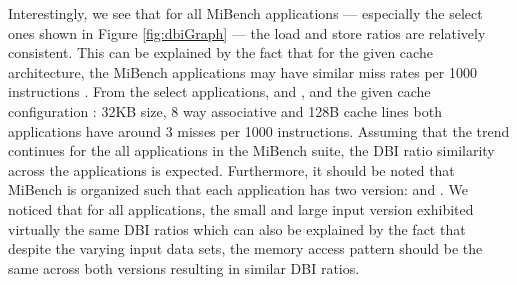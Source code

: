 Interestingly, we see that for all MiBench applications --- especially the
select ones shown in Figure \ref{fig:dbiGraph} --- the load and store ratios
are relatively consistent. This can be explained by the fact that for the given
cache architecture, the MiBench applications may have similar miss rates per
1000 instructions \cite{mibench}. From the select applications, 
and , and the given cache configuration : 32KB size, 8 way
associative and 128B cache lines both applications have around 3 misses per
1000 instructions. Assuming that the trend continues for the all applications
in the MiBench suite, the DBI ratio similarity across the applications is
expected. Furthermore, it should be noted that MiBench is organized such that
each application has two version:  and . We
noticed that for all applications, the small and large input version exhibited
virtually the same DBI ratios which can also be explained by the fact that
despite the varying input data sets, the memory access pattern should be the
same across both versions resulting in similar DBI ratios.
